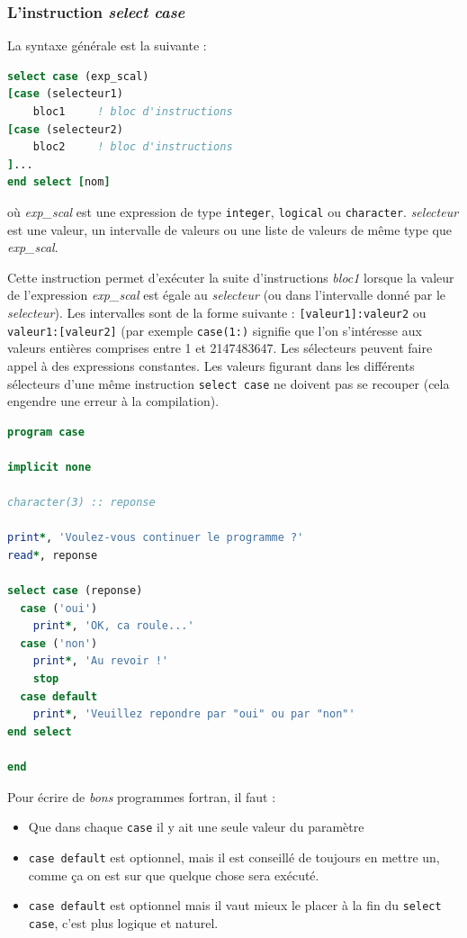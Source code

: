 \documentclass[a4paper,twoside]{article}
\begin{document}
\subsubsection{L'instruction \emph{select case}}

La syntaxe générale est la suivante : 
\begin{lstlisting}[language=Fortran]
select case (exp_scal) 
[case (selecteur1)
    bloc1     ! bloc d'instructions 
[case (selecteur2)
    bloc2     ! bloc d'instructions
]... 
end select [nom]
\end{lstlisting}
où \emph{exp\_scal} est une expression de type \texttt{integer}, \texttt{logical} ou \texttt{character}. \emph{selecteur} est une valeur, un intervalle de valeurs ou une liste de valeurs de même type que \emph{exp\_scal}.

Cette instruction permet d'exécuter la suite d'instructions \emph{bloc1} lorsque la valeur de l'expression \emph{exp\_scal} est égale au \emph{selecteur} (ou dans l'intervalle donné par le \emph{selecteur}). Les intervalles sont de la forme suivante : \texttt{[valeur1]:valeur2} ou \texttt{valeur1:[valeur2]} (par exemple \texttt{case(1:)} signifie que l'on s'intéresse aux valeurs entières comprises entre 1 et 2147483647. Les sélecteurs peuvent faire appel à des expressions constantes. Les valeurs figurant dans les différents sélecteurs d'une même instruction \texttt{select case} ne doivent pas se recouper (cela engendre une erreur à la compilation).

\begin{lstlisting}[language=Fortran]
program case

implicit none

character(3) :: reponse

print*, 'Voulez-vous continuer le programme ?'
read*, reponse

select case (reponse)
  case ('oui')
    print*, 'OK, ca roule...'
  case ('non')
    print*, 'Au revoir !'
    stop
  case default
    print*, 'Veuillez repondre par "oui" ou par "non"'
end select

end
\end{lstlisting}

\begin{remarque}
Pour écrire de \emph{bons} programmes fortran, il faut : 
\begin{itemize}
\item Que dans chaque \texttt{case} il y ait une seule valeur du paramètre
\item \texttt{case default} est optionnel, mais il est conseillé de toujours en mettre un, comme ça on est sur que quelque chose sera exécuté.
\item \texttt{case default} est optionnel mais il vaut mieux le placer à la fin du \texttt{select case}, c'est plus logique et naturel.
\end{itemize}
\end{remarque}
\end{document}
